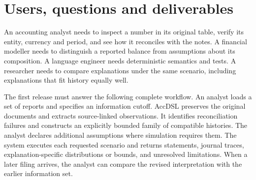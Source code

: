 \section{Users, questions and deliverables}

An accounting analyst needs to inspect a number in its original table, verify
its entity, currency and period, and see how it reconciles with the notes. A
financial modeller needs to distinguish a reported balance from assumptions
about its composition. A language engineer needs deterministic semantics and
tests. A researcher needs to compare explanations under the same scenario,
including explanations that fit history equally well.

The first release must answer the following complete workflow. An analyst
loads a set of reports and specifies an information cutoff. AccDSL preserves
the original documents and extracts source-linked observations. It identifies
reconciliation failures and constructs an explicitly bounded family of
compatible histories. The analyst declares additional assumptions where
simulation requires them. The system executes each requested scenario and
returns statements, journal traces, explanation-specific distributions or
bounds, and unresolved limitations. When a later filing arrives, the analyst
can compare the revised interpretation with the earlier information set.


